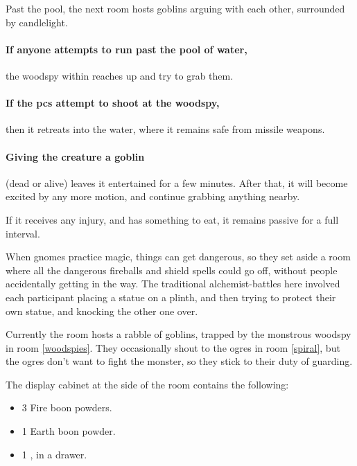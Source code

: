 \begin{multicols}{2}
\begin{boxtext}
  Past the pool, the next room hosts goblins arguing with each other, surrounded by candlelight.
\end{boxtext}


\paragraph{If anyone attempts to run past the pool of water,}
the woodspy within reaches up and try to grab them.

\paragraph{If the \glspl{pc} attempt to shoot at the woodspy,}
then it retreats into the water, where it remains safe from missile weapons.

\paragraph{Giving the creature a goblin}
(dead or alive)
leaves it entertained for a few minutes.
After that, it will become excited by any more motion, and continue grabbing anything nearby.

If it receives any injury, and has something to eat, it remains passive for a full \gls{interval}.


\begin{exampletext}

  When gnomes practice magic, things can get dangerous, so they set aside a room where all the dangerous fireballs and shield spells could go off, without people accidentally getting in the way.
  The traditional alchemist-battles here involved each participant placing a statue on a plinth, and then trying to protect their own statue, and knocking the other one over.

\end{exampletext}

Currently the room hosts a rabble of goblins, trapped by the monstrous woodspy in room \vref{woodspies}.
They occasionally shout to the ogres in room \vref{spiral}, but the ogres don't want to fight the monster, so they stick to their duty of guarding.

The display cabinet at the side of the room contains the following:

\begin{itemize}
  \item
  3 Fire \gls{boon} powders.
  \item
  1 Earth \gls{boon} powder.
  \item
  1 \lootMagic, in a drawer.


\end{itemize}
\end{multicols}

